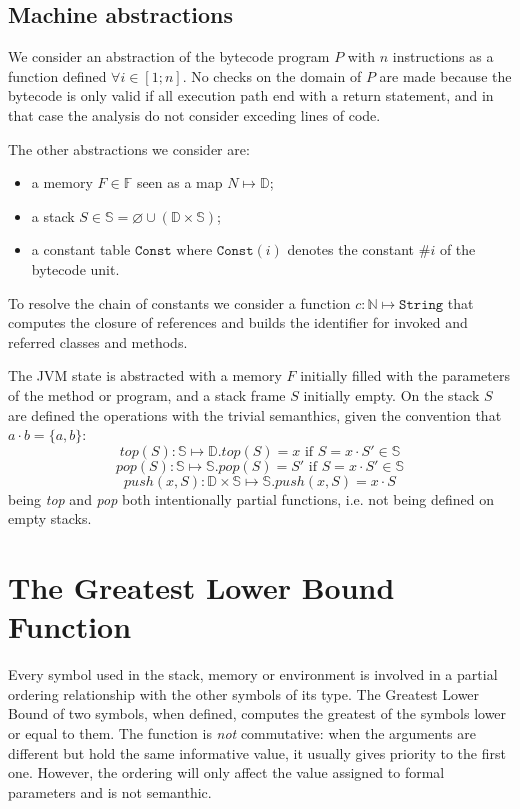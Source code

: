 \documentclass{amsart}
\newcommand{\N}{\mathbb{N}}
\newcommand{\bF}{\mathbb{F}}
\newcommand{\bS}{\mathbb{S}}
\newcommand{\data}{\mathbb{D}}
\newcommand{\Const}{\texttt{Const}}
\renewcommand{\emptyset}{\varnothing}
\numberwithin{equation}{section}
\theoremstyle{plain} %
\theoremstyle{definition}
\theoremstyle{remark}
\begin{document}
\subsection{Machine abstractions}
We consider an abstraction of the bytecode program $P$ with $n$ instructions as a function defined $\forall i \in [1 ; n]$. No checks on the domain of $P$ are made because the bytecode is only valid if all execution path end with a return statement, and in that case the analysis do not consider exceding lines of code.

The other abstractions we consider are:
\begin{itemize}
\item a memory $F \in \bF{}$ seen as a map $N \mapsto \data{}$;
\item a stack $S \in \bS{} = \emptyset \cup (\data{} \times \bS{})$;
\item a constant table $\Const{} \text{ where } \Const{}(i)$ denotes the constant $\#i$ of the bytecode unit.
\end{itemize}

To resolve the chain of constants we consider a function $c : \N{} \mapsto \texttt{String}$ that computes the closure of references and builds the identifier for invoked and referred classes and methods.

The JVM state is abstracted with a memory $F$ initially filled with the parameters of the method or program, and a stack frame $S$ initially empty. On the stack $S$ are defined the operations with the trivial semanthics, given the convention that $a\cdot b = \{a, b\} $:
\[
top(S): \bS{} \mapsto \data{}.top(S) = x \text{ if } S = x \cdot S' \in \bS{}
\]\[pop(S): \bS{} \mapsto \bS{}.pop(S) = S' \text{ if } S = x \cdot S' \in \bS{}
\]\[push(x, S): \data{} \times \bS{} \mapsto \bS{}.push(x, S) = x \cdot S
\]
being \emph{top} and \emph{pop} both intentionally partial functions, i.e. not being defined on empty stacks.\\


\section{The Greatest Lower Bound Function}

Every symbol used in the stack, memory or environment is involved in a partial ordering relationship with the other symbols of its type. The Greatest Lower Bound of two symbols, when defined, computes the greatest of the symbols lower or equal to them. The function is \emph{not} commutative: when the arguments are different but hold the same informative value, it usually gives priority to the first one. However, the ordering will only affect the value assigned to formal parameters and is not semanthic.
\end{document}
